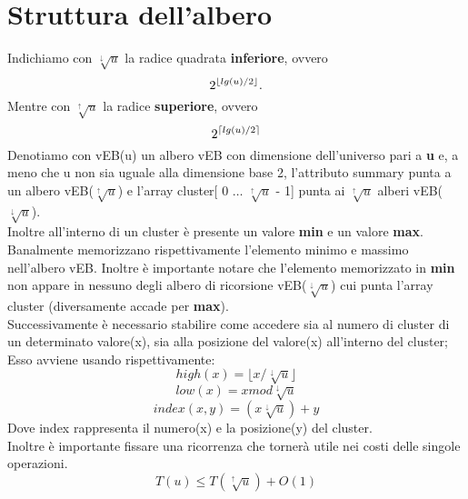 \documentclass{article}
\begin{document}
\section{Struttura dell'albero}
    Indichiamo con $\sqrt[\downarrow]{u}$ la radice quadrata \textbf{inferiore}, ovvero 
    \begin{equation}
        \centering2^{\lfloor lg(u) / 2 \rfloor}.
    \end{equation}
    Mentre con $\sqrt[\uparrow]{u}$ la radice \textbf{superiore}, ovvero 
    \begin{equation}
        \centering2^{\lceil lg(u) / 2 \rceil}
    \end{equation}
    Denotiamo con vEB(u) un albero vEB con dimensione dell'universo pari a \textbf{u} e, a meno che u non sia uguale alla dimensione base 2, l'attributo summary punta a un albero vEB($\sqrt[\uparrow]{u}$) e l'array cluster[ 0 $\dots$ $\sqrt[\uparrow]{u}$ - 1] punta ai $\sqrt[\uparrow]{u}$ alberi vEB($\sqrt[\downarrow]{u}$).\\
    Inoltre all'interno di un cluster è presente un valore \textbf{min} e un valore \textbf{max}. Banalmente memorizzano rispettivamente l'elemento minimo e massimo nell'albero vEB. Inoltre è importante notare che l'elemento memorizzato in \textbf{min} non appare in nessuno degli albero di ricorsione vEB($\sqrt[\downarrow]{u}$) cui punta l'array cluster (diversamente accade per \textbf{max}).\\
    Successivamente è necessario stabilire come accedere sia al numero di cluster di un determinato valore(x), sia alla posizione del valore(x) all'interno del cluster; Esso avviene usando rispettivamente:\\
    \begin{equation}
        high(x) = \lfloor x / \sqrt[\downarrow]{u} \rfloor
    \end{equation}
    \begin{equation}
        low(x) = x mod \sqrt[\downarrow]{u}
    \end{equation}
    \begin{equation}
        index(x, y) = (x\sqrt[\downarrow]{u}) + y
    \end{equation}
    Dove index rappresenta il numero(x) e la posizione(y) del cluster. 
    \\
    Inoltre è importante fissare una ricorrenza che tornerà  utile nei costi delle singole operazioni.
    \begin{equation}
        T(u) \leq T(\sqrt[\uparrow]{u}) + O(1)
    \end{equation}
\end{document}
